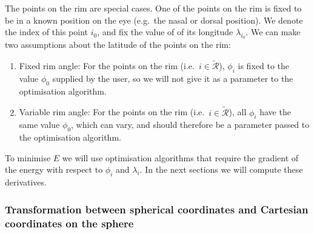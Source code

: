 \documentclass{article}
\begin{document}
The points on the rim are special cases. One of the points on the rim
is fixed to be in a known position on the eye (e.g.~the nasal or
dorsal position). We denote the index of this point $i_0$, and fix the
value of of its longitude $\lambda_{i_0}$. We can make two assumptions
about the latitude of the points on the rim:
\begin{enumerate}
\item Fixed rim angle: For the points on the rim (i.e.~$i \in
  \mathcal{\tilde R}$), $\phi_i$ is fixed to the value $\phi_0$
  supplied by the user, so we will not give it as a parameter to the
  optimisation algorithm.
\item Variable rim angle: For the points on the rim (i.e.~$i \in
  \mathcal{\tilde R}$), all $\phi_i$ have the same value $\phi_0$,
  which can vary, and should therefore be a parameter passed to the
  optimisation algorithm.
\end{enumerate}

To minimise $E$ we will use optimisation algorithms that require the
gradient of the energy with respect to $\phi_i$ and $\lambda_i$. In
the next sections we will compute these derivatives.

\subsubsection{Transformation between spherical coordinates and Cartesian
  coordinates on the sphere}
\label{retistruct-algorithm:sec:transf-betw-spher}
\end{document}
